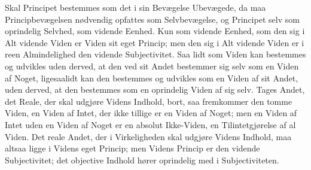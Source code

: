 \documentclass[12pt]{book}
\begin{document}
Skal Principet bestemmes som det i sin Bevægelse Ubevægede, da maa Principbevægelsen
nødvendig opfattes som Selvbevægelse, og Principet selv som oprindelig Selvhed, som
vidende Eenhed. Kun som vidende Eenhed, som den sig i Alt vidende Viden er Viden sit
eget Princip; men den sig i Alt vidende Viden er i reen Almindelighed den vidende
Subjectivitet. Saa lidt som Viden kan bestemmes og udvikles uden derved, at den ved
sit Andet bestemmer sig selv som en Viden af Noget, ligesaalidt kan den bestemmes og
udvikles som en Viden af sit Andet, uden derved, at den bestemmes som en oprindelig
Viden af sig selv. Tages Andet, det Reale, der skal udgjøre Videns Indhold, bort, saa
fremkommer den tomme Viden, en Viden af Intet, der ikke tillige er en Viden af Noget;
men en Viden af Intet uden en Viden af Noget er en absolut Ikke-Viden, en
Tilintetgjørelse af al Viden. Det reale Andet, der i Virkeligheden skal udgjøre Videns
Indhold, maa altsaa ligge i Videns eget Princip; men Videns Princip er den vidende
Subjectivitet; det objective Indhold hører oprindelig med i Subjectiviteten.
\end{document}
